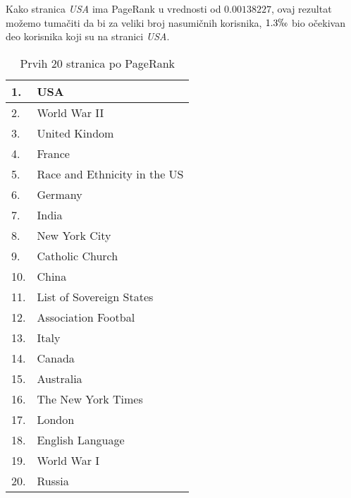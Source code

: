 \documentclass[12pt, journal, compsoc]{IEEEtran}
\begin{document}
Kako stranica \textit{USA} ima PageRank u vrednosti od $0.00138227$, ovaj rezultat možemo tumačiti da bi za veliki broj nasumičnih korisnika, $1.3\permil$ bio očekivan deo korisnika koji su na stranici \textit{USA}.
\begin{table}[]
\large
\centering
\begin{tabular}{|l|l|}
\hline
1.                 & USA                            \\ \hline
2.                 & World War II                         \\ \hline
3.                 & United Kindom                \\ \hline
4.                 & France                     \\ \hline
5.                 & Race and Ethnicity in the US \\ \hline
6.                 & Germany                         \\ \hline
7.                 & India                \\ \hline
8.                 & New York City                     \\ \hline
9.                 & Catholic Church                            \\ \hline
10.                 & China                         \\ \hline
11.                 & List of Sovereign States                \\ \hline
12.                 & Association Footbal                     \\ \hline
13.                 & Italy                            \\ \hline
14.                 & Canada                         \\ \hline
15.                 & Australia                \\ \hline
16.                 & The New York Times                     \\ \hline
17.                 & London                            \\ \hline
18.                 & English Language                         \\ \hline
19.                 & World War I                \\ \hline
20.          & Russia                    \\ \hline
\end{tabular}
\caption{Prvih 20 stranica po PageRank}
\label{tabelatop20}
\end{table}
\end{document}
